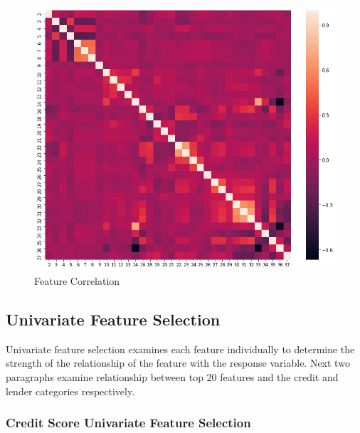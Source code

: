 \begin{Schunk}
\begin{figure}[H]

{\centering \includegraphics[width=0.75\linewidth]{../../artifacts/cmatrix} 

}

\caption[Feature Correlation]{Feature Correlation}\label{fig:cmatrix}
\end{figure}
\end{Schunk}

\hypertarget{univariate-feature-selection}{%
\subsection{Univariate Feature
Selection}\label{univariate-feature-selection}}

Univariate feature selection examines each feature individually to
determine the strength of the relationship of the feature with the
response variable. Next two paragraphs examine relationship between top
20 features and the credit and lender categories respectively.

\hypertarget{credit-score-univariate-feature-selection}{%
\subsubsection{Credit Score Univariate Feature
Selection}\label{credit-score-univariate-feature-selection}}

